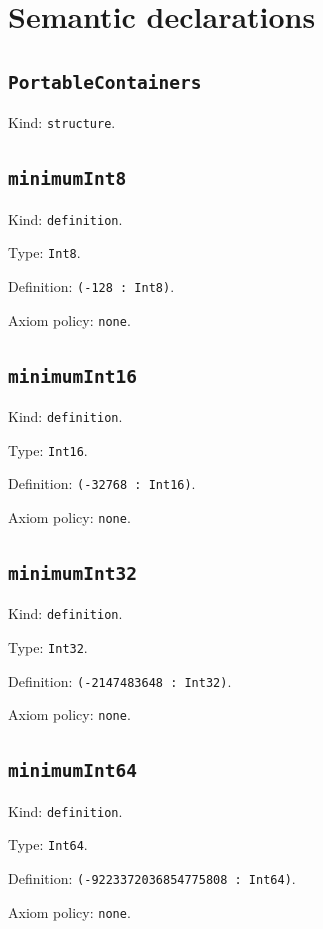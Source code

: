 \documentclass[11pt]{article}
\begin{document}
\section*{Semantic declarations}
\subsection*{\texttt{PortableContainers}}
\noindent Kind: \texttt{structure}.\par
\subsection*{\texttt{minimumInt8}}
\noindent Kind: \texttt{definition}.\par
\noindent Type: \texttt{Int8}.\par
\noindent Definition: \texttt{(-128 : Int8)}.\par
\noindent Axiom policy: \texttt{none}.\par
\subsection*{\texttt{minimumInt16}}
\noindent Kind: \texttt{definition}.\par
\noindent Type: \texttt{Int16}.\par
\noindent Definition: \texttt{(-32768 : Int16)}.\par
\noindent Axiom policy: \texttt{none}.\par
\subsection*{\texttt{minimumInt32}}
\noindent Kind: \texttt{definition}.\par
\noindent Type: \texttt{Int32}.\par
\noindent Definition: \texttt{(-2147483648 : Int32)}.\par
\noindent Axiom policy: \texttt{none}.\par
\subsection*{\texttt{minimumInt64}}
\noindent Kind: \texttt{definition}.\par
\noindent Type: \texttt{Int64}.\par
\noindent Definition: \texttt{(-9223372036854775808 : Int64)}.\par
\noindent Axiom policy: \texttt{none}.\par
\end{document}
